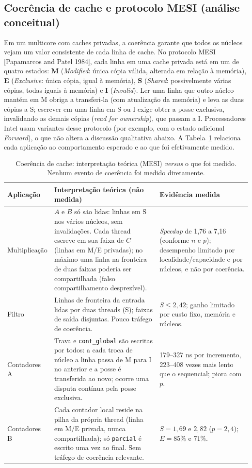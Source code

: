 \documentclass[12pt,a4paper]{article}
\begin{document}
\subsection{Coerência de cache e protocolo MESI (análise conceitual)}

Em um multicore com caches privadas, a coerência garante que todos os núcleos vejam um valor consistente de cada linha de cache. No protocolo MESI [Papamarcos and Patel 1984], cada linha em uma cache privada está em um de quatro estados: \textbf{M} (\emph{Modified}: única cópia válida, alterada em relação à memória), \textbf{E} (\emph{Exclusive}: única cópia, igual à memória), \textbf{S} (\emph{Shared}: possivelmente várias cópias, todas iguais à memória) e \textbf{I} (\emph{Invalid}). Ler uma linha que outro núcleo mantém em M obriga a transferi-la (com atualização da memória) e leva as duas cópias a S; escrever em uma linha em S ou I exige obter a posse exclusiva, invalidando as demais cópias (\emph{read for ownership}), que passam a I. Processadores Intel usam variantes desse protocolo (por exemplo, com o estado adicional \emph{Forward}), o que não altera a discussão qualitativa abaixo. A Tabela~\ref{tab:mesi} relaciona cada aplicação ao comportamento esperado e ao que foi efetivamente medido.

\begin{table}[!htbp]
\caption{Coerência de cache: interpretação teórica (MESI) \emph{versus} o que foi medido. Nenhum evento de coerência foi medido diretamente.}
\label{tab:mesi}
\centering\footnotesize
\begin{tabular}{@{}p{2.5cm}p{5.8cm}p{5.5cm}@{}}
\toprule
Aplicação & Interpretação teórica (não medida) & Evidência medida \\
\midrule
Multiplicação & $A$ e $B$ só são lidas: linhas em S nos vários núcleos, sem invalidações. Cada thread escreve em sua faixa de $C$ (linhas em M/E privadas); no máximo uma linha na fronteira de duas faixas poderia ser compartilhada (falso compartilhamento desprezível). & \emph{Speedup} de 1,76 a 7,16 (conforme $n$ e $p$); desempenho limitado por localidade/capacidade e por núcleos, e não por coerência. \\
Filtro & Linhas de fronteira da entrada lidas por duas threads (S); faixas de saída disjuntas. Pouco tráfego de coerência. & $S\le 2{,}42$; ganho limitado por custo fixo, memória e núcleos. \\
Contadores A & Trava e \texttt{cont\_global} são escritas por todos: a cada troca de núcleo a linha passa de M para I no anterior e a posse é transferida ao novo; ocorre uma disputa contínua pela posse exclusiva. & 179--327 ns por incremento, 223--408 vezes mais lento que o sequencial; piora com $p$. \\
Contadores B & Cada contador local reside na pilha da própria thread (linha em M/E privada, nunca compartilhada); só \texttt{parcial} é escrito uma vez ao final. Sem tráfego de coerência relevante. & $S=1{,}69$ e $2{,}82$ ($p=2,4$); $E=85\%$ e $71\%$. \\
\bottomrule
\end{tabular}
\end{table}
\end{document}
